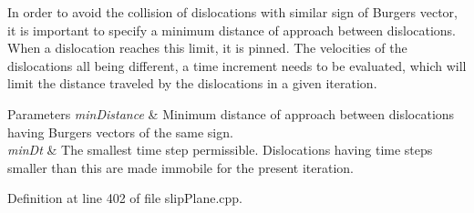 In order to avoid the collision of dislocations with similar sign of Burgers vector, it is important to specify a minimum distance of approach between dislocations. When a dislocation reaches this limit, it is pinned. The velocities of the dislocations all being different, a time increment needs to be evaluated, which will limit the distance traveled by the dislocations in a given iteration. 
\begin{DoxyParams}{Parameters}
{\em min\-Distance} & Minimum distance of approach between dislocations having Burgers vectors of the same sign. \\
\hline
{\em min\-Dt} & The smallest time step permissible. Dislocations having time steps smaller than this are made immobile for the present iteration. \\
\hline
\end{DoxyParams}


Definition at line 402 of file slip\-Plane.\-cpp.



